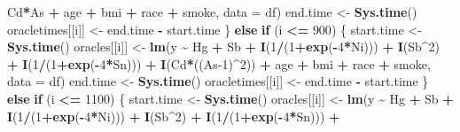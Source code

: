 \documentclass[12pt, twoside]{amherstthesis}
\newenvironment{Shaded}{\begin{snugshade}}{\end{snugshade}}
\newcommand{\AttributeTok}[1]{\textcolor[rgb]{0.13,0.29,0.53}{#1}}
\newcommand{\ControlFlowTok}[1]{\textcolor[rgb]{0.13,0.29,0.53}{\textbf{#1}}}
\newcommand{\DecValTok}[1]{\textcolor[rgb]{0.00,0.00,0.81}{#1}}
\newcommand{\FunctionTok}[1]{\textcolor[rgb]{0.13,0.29,0.53}{\textbf{#1}}}
\newcommand{\NormalTok}[1]{#1}
\newcommand{\OtherTok}[1]{\textcolor[rgb]{0.56,0.35,0.01}{#1}}
\newcommand{\SpecialCharTok}[1]{\textcolor[rgb]{0.81,0.36,0.00}{\textbf{#1}}}
\begin{document}
\begin{Shaded}
\begin{Highlighting}[]
\NormalTok{                           Cd}\SpecialCharTok{*}\NormalTok{As }\SpecialCharTok{+} 
\NormalTok{                           age }\SpecialCharTok{+}\NormalTok{ bmi }\SpecialCharTok{+}\NormalTok{ race }\SpecialCharTok{+}\NormalTok{ smoke, }\AttributeTok{data =}\NormalTok{ df)}
\NormalTok{      end.time }\OtherTok{\textless{}{-}} \FunctionTok{Sys.time}\NormalTok{()}
\NormalTok{      oracletimes[[i]] }\OtherTok{\textless{}{-}}\NormalTok{ end.time }\SpecialCharTok{{-}}\NormalTok{ start.time}
\NormalTok{    \} }\ControlFlowTok{else} \ControlFlowTok{if}\NormalTok{ (i }\SpecialCharTok{\textless{}=} \DecValTok{900}\NormalTok{) \{}
\NormalTok{      start.time }\OtherTok{\textless{}{-}} \FunctionTok{Sys.time}\NormalTok{()}
\NormalTok{      oracles[[i]] }\OtherTok{\textless{}{-}} \FunctionTok{lm}\NormalTok{(y }\SpecialCharTok{\textasciitilde{}}\NormalTok{ Hg }\SpecialCharTok{+}\NormalTok{ Sb }\SpecialCharTok{+}
                           \FunctionTok{I}\NormalTok{(}\DecValTok{1}\SpecialCharTok{/}\NormalTok{(}\DecValTok{1}\SpecialCharTok{+}\FunctionTok{exp}\NormalTok{(}\SpecialCharTok{{-}}\DecValTok{4}\SpecialCharTok{*}\NormalTok{Ni))) }\SpecialCharTok{+} \FunctionTok{I}\NormalTok{(Sb}\SpecialCharTok{\^{}}\DecValTok{2}\NormalTok{) }\SpecialCharTok{+} \FunctionTok{I}\NormalTok{(}\DecValTok{1}\SpecialCharTok{/}\NormalTok{(}\DecValTok{1}\SpecialCharTok{+}\FunctionTok{exp}\NormalTok{(}\SpecialCharTok{{-}}\DecValTok{4}\SpecialCharTok{*}\NormalTok{Sn))) }\SpecialCharTok{+}
                           \FunctionTok{I}\NormalTok{(Cd}\SpecialCharTok{*}\NormalTok{((As}\DecValTok{{-}1}\NormalTok{)}\SpecialCharTok{\^{}}\DecValTok{2}\NormalTok{)) }\SpecialCharTok{+} 
\NormalTok{                           age }\SpecialCharTok{+}\NormalTok{ bmi }\SpecialCharTok{+}\NormalTok{ race }\SpecialCharTok{+}\NormalTok{ smoke, }\AttributeTok{data =}\NormalTok{ df)}
\NormalTok{      end.time }\OtherTok{\textless{}{-}} \FunctionTok{Sys.time}\NormalTok{()}
\NormalTok{      oracletimes[[i]] }\OtherTok{\textless{}{-}}\NormalTok{ end.time }\SpecialCharTok{{-}}\NormalTok{ start.time}
\NormalTok{    \} }\ControlFlowTok{else} \ControlFlowTok{if}\NormalTok{ (i }\SpecialCharTok{\textless{}=} \DecValTok{1100}\NormalTok{) \{}
\NormalTok{      start.time }\OtherTok{\textless{}{-}} \FunctionTok{Sys.time}\NormalTok{()}
\NormalTok{      oracles[[i]] }\OtherTok{\textless{}{-}} \FunctionTok{lm}\NormalTok{(y }\SpecialCharTok{\textasciitilde{}}\NormalTok{ Hg }\SpecialCharTok{+}\NormalTok{ Sb }\SpecialCharTok{+}
                           \FunctionTok{I}\NormalTok{(}\DecValTok{1}\SpecialCharTok{/}\NormalTok{(}\DecValTok{1}\SpecialCharTok{+}\FunctionTok{exp}\NormalTok{(}\SpecialCharTok{{-}}\DecValTok{4}\SpecialCharTok{*}\NormalTok{Ni))) }\SpecialCharTok{+} \FunctionTok{I}\NormalTok{(Sb}\SpecialCharTok{\^{}}\DecValTok{2}\NormalTok{) }\SpecialCharTok{+} \FunctionTok{I}\NormalTok{(}\DecValTok{1}\SpecialCharTok{/}\NormalTok{(}\DecValTok{1}\SpecialCharTok{+}\FunctionTok{exp}\NormalTok{(}\SpecialCharTok{{-}}\DecValTok{4}\SpecialCharTok{*}\NormalTok{Sn))) }\SpecialCharTok{+}

\end{Highlighting}
\end{Shaded}
\end{document}
